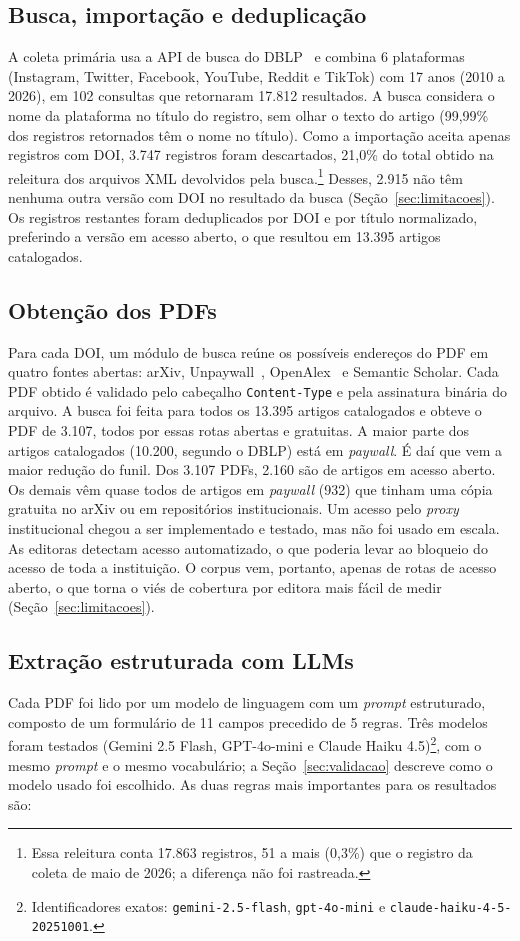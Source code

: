 \documentclass[11pt,a4paper]{article}
\begin{document}
\subsection{Busca, importação e deduplicação}
A coleta primária usa a API de busca do DBLP~\citep{ley2002dblp} e combina 6
plataformas (Instagram, Twitter, Facebook, YouTube, Reddit e TikTok) com 17
anos (2010 a 2026), em 102 consultas que retornaram 17.812 resultados. A busca considera o nome da
plataforma no título do registro, sem olhar o texto do artigo (99,99\% dos
registros retornados têm o nome no título). Como a importação aceita apenas registros com DOI, 3.747 registros foram descartados, 21,0\% do total obtido na releitura
dos arquivos XML devolvidos pela busca.\footnote{Essa releitura conta 17.863
registros, 51 a mais (0,3\%) que o registro da coleta de maio de 2026; a
diferença não foi rastreada.} Desses, 2.915 não têm nenhuma outra versão com
DOI no resultado da busca (Seção~\ref{sec:limitacoes}). Os registros restantes
foram deduplicados por DOI e por título normalizado, preferindo a versão em
acesso aberto, o que resultou em 13.395 artigos catalogados.

\subsection{Obtenção dos PDFs}
Para cada DOI, um módulo de busca reúne os possíveis endereços do PDF em quatro
fontes abertas: arXiv, Unpaywall~\citep{piwowar2018unpaywall},
OpenAlex~\citep{priem2022openalex} e Semantic Scholar. Cada PDF obtido é
validado pelo cabeçalho \texttt{Content-Type} e pela assinatura binária do
arquivo. A busca foi feita para todos os 13.395 artigos catalogados e obteve o PDF de
3.107, todos por essas rotas abertas e gratuitas. A maior parte dos artigos
catalogados (10.200, segundo o DBLP) está em \textit{paywall}. É daí que vem a maior
redução do funil. Dos 3.107 PDFs, 2.160 são de artigos em acesso aberto. Os demais vêm
quase todos de artigos em \textit{paywall} (932) que tinham uma cópia gratuita no
arXiv ou em repositórios institucionais. Um acesso pelo \textit{proxy}
institucional chegou a ser implementado e testado, mas não foi usado em escala.
As editoras detectam acesso automatizado, o que poderia levar ao bloqueio do acesso de toda a instituição. O corpus vem, portanto,
apenas de rotas de acesso aberto, o que torna o viés de cobertura por editora mais fácil
de medir (Seção~\ref{sec:limitacoes}).

\subsection{Extração estruturada com LLMs}
\label{sec:extracao}
Cada PDF foi lido por um modelo de linguagem com um \textit{prompt}
estruturado, composto de um formulário de 11 campos precedido de 5 regras. Três modelos
foram testados (Gemini 2.5 Flash, GPT-4o-mini e Claude Haiku
4.5)\footnote{Identificadores exatos: \texttt{gemini-2.5-flash},
\texttt{gpt-4o-mini} e \texttt{claude-haiku-4-5-20251001}.}, com o mesmo
\textit{prompt} e o mesmo vocabulário; a Seção~\ref{sec:validacao} descreve
como o modelo usado foi escolhido. As duas regras mais importantes para os
resultados são:
\end{document}
